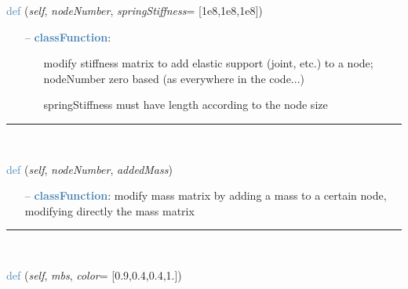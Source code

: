 \begin{itemize}[leftmargin=1.4cm]
\begin{itemize}[leftmargin=1.4cm]
\begin{itemize}[leftmargin=0.5cm]
\begin{itemize}[leftmargin=1.4cm]
\begin{itemize}[leftmargin=1.4cm]
\begin{itemize}[leftmargin=0.5cm]
\begin{flushleft}
\noindent \textcolor{steelblue}{def {\bf {}}}\label{sec:FEM:FEMinterface:AddElasticSupportAtNode}
({\it self}, {\it nodeNumber}, {\it springStiffness}= [1e8,1e8,1e8])
\end{flushleft}
\setlength{\itemindent}{0.7cm}
\begin{itemize}[leftmargin=0.7cm]
\item[--]\textcolor{steelblue}{\bf classFunction}: \vspace{-6pt}
\begin{itemize}[leftmargin=1.2cm]
\setlength{\itemindent}{-0.7cm}
\item[]modify stiffness matrix to add elastic support (joint, etc.) to a node; nodeNumber zero based (as everywhere in the code...)
\item[]springStiffness must have length according to the node size
\end{itemize}
\vspace{12pt}\end{itemize}
%
\noindent\rule{8cm}{0.75pt}\vspace{1pt} \\ 
\begin{flushleft}
\noindent \textcolor{steelblue}{def {\bf {}}}\label{sec:FEM:FEMinterface:AddNodeMass}
({\it self}, {\it nodeNumber}, {\it addedMass})
\end{flushleft}
\setlength{\itemindent}{0.7cm}
\begin{itemize}[leftmargin=0.7cm]
\item[--]\textcolor{steelblue}{\bf classFunction}: modify mass matrix by adding a mass to a certain node, modifying directly the mass matrix
\vspace{12pt}\end{itemize}
%
\noindent\rule{8cm}{0.75pt}\vspace{1pt} \\ 
\begin{flushleft}
\noindent \textcolor{steelblue}{def {\bf {}}}\label{sec:FEM:FEMinterface:CreateLinearFEMObjectGenericODE2}
({\it self}, {\it mbs}, {\it color}= [0.9,0.4,0.4,1.])
\end{flushleft}
\setlength{\itemindent}{0.7cm}

\end{itemize}
\end{itemize}
\end{itemize}
\end{itemize}
\end{itemize}
\end{itemize}
